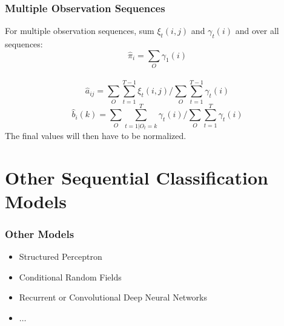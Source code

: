 \documentclass{beamer}
\begin{document}
\begin{frame}
    \frametitle{Multiple Observation Sequences}
    For multiple observation sequences, sum $\xi_t(i,j)$ and $\gamma_t(i)$ and
    over all sequences:
    \begin{displaymath}
        \hat{\pi}_i = \sum_{O}\gamma_1(i)
    \end{displaymath}\\
    \begin{displaymath}
        \hat{a}_{ij} = \sum_{O}\sum_{t=1}^{T-1}\xi_t(i,j) \Bigg/ \sum_{O}\sum_{t=1}^{T-1}\gamma_t(i)
    \end{displaymath}
    \vfill
    \begin{displaymath}
        \hat{b}_i(k) = \sum_{O}\sum_{t=1 | O_t=k}^T\gamma_t(i) \Bigg/ \sum_{O}\sum_{t=1}^T\gamma_t(i)
    \end{displaymath}
    The final values will then have to be normalized.
\end{frame}



\section{Other Sequential Classification Models}

\begin{frame} \frametitle{Other Models}
  
  \begin{itemize}
  \item Structured Perceptron
  \item Conditional Random Fields
  \item Recurrent or Convolutional Deep Neural Networks
  \item $\ldots$
  \end{itemize}
 
\end{frame}
\end{document}
